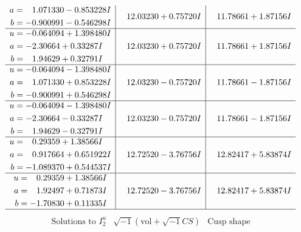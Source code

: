 \documentclass[1p]{elsarticle_modified}
\theoremstyle{definition}
\newcommand{\I}{\sqrt{-1}}
\begin{document}
$$\begin{array}{c|c|c}
\begin{aligned}
a &= \phantom{-}1.071330 - 0.853228 I \\
b &= -0.900991 - 0.546298 I\end{aligned}
 & \phantom{-}12.03230 + 0.75720 I & \phantom{-}11.78661 + 1.87156 I \\ \hline\begin{aligned}
u &= -0.064094 + 1.398480 I \\
a &= -2.30664 + 0.33287 I \\
b &= \phantom{-}1.94629 + 0.32791 I\end{aligned}
 & \phantom{-}12.03230 + 0.75720 I & \phantom{-}11.78661 + 1.87156 I \\ \hline\begin{aligned}
u &= -0.064094 - 1.398480 I \\
a &= \phantom{-}1.071330 + 0.853228 I \\
b &= -0.900991 + 0.546298 I\end{aligned}
 & \phantom{-}12.03230 - 0.75720 I & \phantom{-}11.78661 - 1.87156 I \\ \hline\begin{aligned}
u &= -0.064094 - 1.398480 I \\
a &= -2.30664 - 0.33287 I \\
b &= \phantom{-}1.94629 - 0.32791 I\end{aligned}
 & \phantom{-}12.03230 - 0.75720 I & \phantom{-}11.78661 - 1.87156 I \\ \hline\begin{aligned}
u &= \phantom{-}0.29359 + 1.38566 I \\
a &= \phantom{-}0.917664 + 0.651922 I \\
b &= -1.089370 + 0.544537 I\end{aligned}
 & \phantom{-}12.72520 - 3.76756 I & \phantom{-}12.82417 + 5.83874 I \\ \hline\begin{aligned}
u &= \phantom{-}0.29359 + 1.38566 I \\
a &= \phantom{-}1.92497 + 0.71873 I \\
b &= -1.70830 + 0.11335 I\end{aligned}
 & \phantom{-}12.72520 - 3.76756 I & \phantom{-}12.82417 + 5.83874 I\\
 \hline 
 \end{array}$$\newpage$$\begin{array}{c|c|c}  
\text{Solutions to }I^u_{2}& \I (\text{vol} + \sqrt{-1}CS) & \text{Cusp shape}\\
 \hline 
\begin{aligned}

\end{aligned}
\end{array}$$
\end{document}
